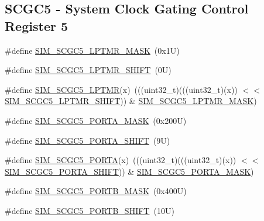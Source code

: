 \subsection*{S\+C\+G\+C5 -\/ System Clock Gating Control Register 5}
\begin{DoxyCompactItemize}
\item 
\#define \mbox{\hyperlink{group___s_i_m___register___masks_ga6f63b73e0ad63163df381c795d583cc1}{S\+I\+M\+\_\+\+S\+C\+G\+C5\+\_\+\+L\+P\+T\+M\+R\+\_\+\+M\+A\+SK}}~(0x1\+U)
\item 
\#define \mbox{\hyperlink{group___s_i_m___register___masks_ga9b3669f3f4f380e18133785d6356c56c}{S\+I\+M\+\_\+\+S\+C\+G\+C5\+\_\+\+L\+P\+T\+M\+R\+\_\+\+S\+H\+I\+FT}}~(0\+U)
\item 
\#define \mbox{\hyperlink{group___s_i_m___register___masks_gab1ead6f54c5176113ceb9b609d7287b7}{S\+I\+M\+\_\+\+S\+C\+G\+C5\+\_\+\+L\+P\+T\+MR}}(x)~(((uint32\+\_\+t)(((uint32\+\_\+t)(x)) $<$$<$ \mbox{\hyperlink{group___s_i_m___register___masks_ga9b3669f3f4f380e18133785d6356c56c}{S\+I\+M\+\_\+\+S\+C\+G\+C5\+\_\+\+L\+P\+T\+M\+R\+\_\+\+S\+H\+I\+FT}})) \& \mbox{\hyperlink{group___s_i_m___register___masks_ga6f63b73e0ad63163df381c795d583cc1}{S\+I\+M\+\_\+\+S\+C\+G\+C5\+\_\+\+L\+P\+T\+M\+R\+\_\+\+M\+A\+SK}})
\item 
\#define \mbox{\hyperlink{group___s_i_m___register___masks_ga9c4853233394870202cccd7844fc8a56}{S\+I\+M\+\_\+\+S\+C\+G\+C5\+\_\+\+P\+O\+R\+T\+A\+\_\+\+M\+A\+SK}}~(0x200\+U)
\item 
\#define \mbox{\hyperlink{group___s_i_m___register___masks_gaa7a1683eaa07a5c5adcaddf4b99ed83a}{S\+I\+M\+\_\+\+S\+C\+G\+C5\+\_\+\+P\+O\+R\+T\+A\+\_\+\+S\+H\+I\+FT}}~(9\+U)
\item 
\#define \mbox{\hyperlink{group___s_i_m___register___masks_ga4f6394bfabad2f1c8669037fd0ea30e7}{S\+I\+M\+\_\+\+S\+C\+G\+C5\+\_\+\+P\+O\+R\+TA}}(x)~(((uint32\+\_\+t)(((uint32\+\_\+t)(x)) $<$$<$ \mbox{\hyperlink{group___s_i_m___register___masks_gaa7a1683eaa07a5c5adcaddf4b99ed83a}{S\+I\+M\+\_\+\+S\+C\+G\+C5\+\_\+\+P\+O\+R\+T\+A\+\_\+\+S\+H\+I\+FT}})) \& \mbox{\hyperlink{group___s_i_m___register___masks_ga9c4853233394870202cccd7844fc8a56}{S\+I\+M\+\_\+\+S\+C\+G\+C5\+\_\+\+P\+O\+R\+T\+A\+\_\+\+M\+A\+SK}})
\item 
\#define \mbox{\hyperlink{group___s_i_m___register___masks_ga5509cf72c7508dd77f0a1a9e631943e8}{S\+I\+M\+\_\+\+S\+C\+G\+C5\+\_\+\+P\+O\+R\+T\+B\+\_\+\+M\+A\+SK}}~(0x400\+U)
\item 
\#define \mbox{\hyperlink{group___s_i_m___register___masks_ga491c4800f5437a9e2d235a77819e434d}{S\+I\+M\+\_\+\+S\+C\+G\+C5\+\_\+\+P\+O\+R\+T\+B\+\_\+\+S\+H\+I\+FT}}~(10\+U)

\end{DoxyCompactItemize}
